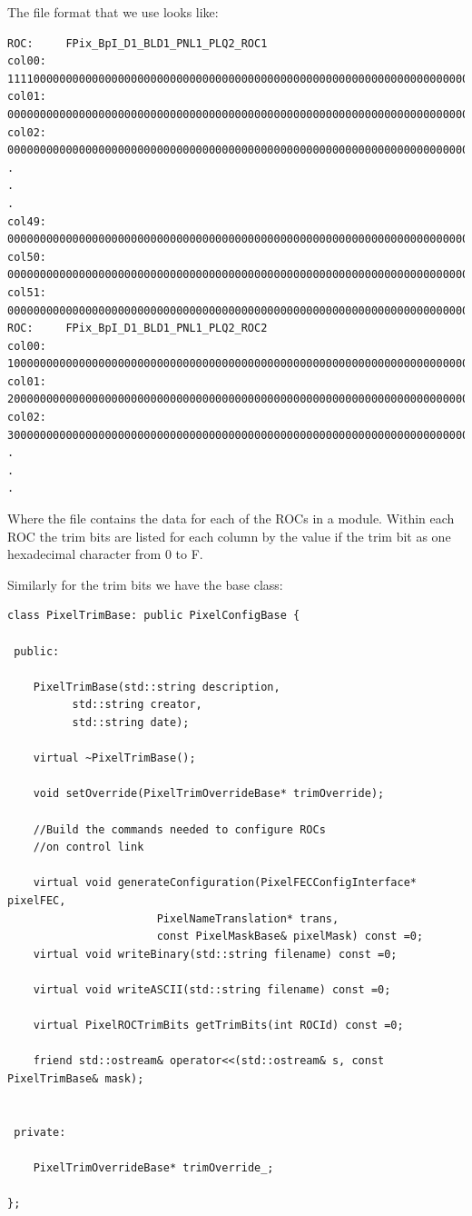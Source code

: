 The file format that we use looks like:
\begin{verbatim}
ROC:     FPix_BpI_D1_BLD1_PNL1_PLQ2_ROC1
col00:   11110000000000000000000000000000000000000000000000000000000000000000000000000000
col01:   00000000000000000000000000000000000000000000000000000000000000000000000000000000
col02:   00000000000000000000000000000000000000000000000000000000000000000000000000000000
.
.
.
col49:   00000000000000000000000000000000000000000000000000000000000000000000000000000000
col50:   00000000000000000000000000000000000000000000000000000000000000000000000000000000
col51:   00000000000000000000000000000000000000000000000000000000000000000000000000000000
ROC:     FPix_BpI_D1_BLD1_PNL1_PLQ2_ROC2
col00:   10000000000000000000000000000000000000000000000000000000000000000000000000000000
col01:   20000000000000000000000000000000000000000000000000000000000000000000000000000000
col02:   30000000000000000000000000000000000000000000000000000000000000000000000000000000
.
.
.
\end{verbatim}
Where the file contains the data for each of the ROCs in a module.
Within each ROC the trim bits are listed for each column by the
value if the trim bit as one hexadecimal character from 0 to F.


Similarly for the trim bits we have the base class:

\begin{verbatim}
class PixelTrimBase: public PixelConfigBase {

 public:

    PixelTrimBase(std::string description, 
		  std::string creator,
		  std::string date);

    virtual ~PixelTrimBase();
    
    void setOverride(PixelTrimOverrideBase* trimOverride);

    //Build the commands needed to configure ROCs
    //on control link

    virtual void generateConfiguration(PixelFECConfigInterface* pixelFEC,
				       PixelNameTranslation* trans,
				       const PixelMaskBase& pixelMask) const =0;
    virtual void writeBinary(std::string filename) const =0;

    virtual void writeASCII(std::string filename) const =0;

    virtual PixelROCTrimBits getTrimBits(int ROCId) const =0;

    friend std::ostream& operator<<(std::ostream& s, const PixelTrimBase& mask);


 private:

    PixelTrimOverrideBase* trimOverride_;

};
\end{verbatim}

